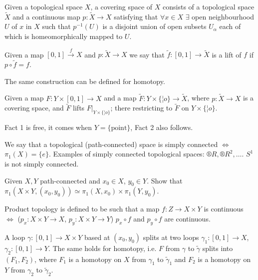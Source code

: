 \documentclass[12pt]{article}					%
\begin{document}
\begin{definice}
	Given a topological space $X$, a covering space of $X$ consists of a topological space $\tilde X$ and a continuous map $p: \tilde X \rightarrow X$ satisfying that $\forall x \in X$ $\exists$ open neighbourhood $U$ of $x$ in $X$ such that $p^{-1}(U)$ is a disjoint union of open subsets $U_α$ each of which is homeomorphically mapped to $U$.
\end{definice}

\begin{definice}
	Given a map $[0, 1] \overset{f}\rightarrow X$ and $p: \tilde X \rightarrow X$ we say that $\tilde f:[0, 1] \rightarrow \tilde X$ is a lift of $f$ if $p ∘ \tilde f = f$.

	The same construction can be defined for homotopy.
\end{definice}

\begin{tvrzeni}[*]
	Given a map $F: Y \times [0, 1] \rightarrow X$ and a map $\tilde F: Y \times \{¦o\} \rightarrow \tilde X$, where $p: \tilde X \rightarrow X$ is a covering space, and $\tilde F$ lifts $F|_{Y \times \{¦o\}}$; there restricting to $\tilde F$ on $Y \times \{¦o\}$.

	\begin{poznamka}
		Fact 1 is free, it comes when $Y = \{\text{point}\}$, Fact 2 also follows.
	\end{poznamka}
\end{tvrzeni}


\begin{priklad}
	We say that a topological (path-connected) space is simply connected $\Leftrightarrow$ $π_1(X) = \{e\}$. Examples of simply connected topological spaces: $®R, ®R^2, …$. $S^1$ is not simply connected.
\end{priklad}

\begin{priklad}
	Given $X, Y$ path-connected and $x_0 \in X$, $y_0 \in Y$. Show that $π_1(X\times Y, (x_0, y_0)) \simeq π_1(X, x_0) \times π_1(Y, y_0)$.

	\begin{reseni}
		Product topology is defined to be such that a map $f: Z \rightarrow X \times Y$ is continuous $\Leftrightarrow$ ($p_x: X\times Y \rightarrow X$, $p_y: X \times Y \rightarrow Y$) $p_x ∘ f$ and $p_y ∘ f$ are continuous.

		A loop $γ: [0, 1] \rightarrow X \times Y$ based at $(x_0, y_0)$ splits at two loops $γ_1: [0, 1] \rightarrow X$, $γ_2: [0, 1] \rightarrow Y$. The same holds for homotopy, i.e. $F$ from $γ$ to $\tilde γ$ splits into $(F_1, F_2)$, where $F_1$ is a homotopy on $X$ from $γ_1$ to $\tilde γ_1$ and $F_2$ is a homotopy on $Y$ from $γ_2$ to $\tilde γ_2$.
	\end{reseni}
\end{priklad}
\end{document}
